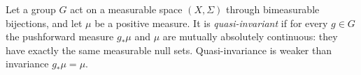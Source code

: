 
Let a group $G$ act on a measurable space $(X,\Sigma)$ through bimeasurable bijections, and let $\mu$ be a positive measure. It is \emph{quasi-invariant} if for every $g\in G$ the pushforward measure $g_*\mu$ and $\mu$ are mutually absolutely continuous: they have exactly the same measurable null sets. Quasi-invariance is weaker than invariance $g_*\mu=\mu$.
